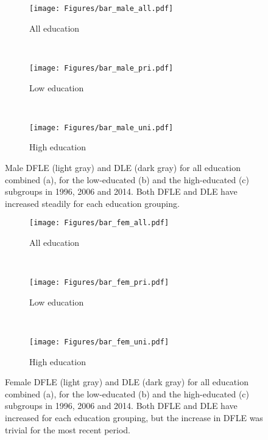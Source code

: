 \begin{figure}[ht!]
    \centering
    \begin{subfigure}[b]{0.2\textwidth}
        \texttt{[image: Figures/bar\_male\_all.pdf]}
        \caption{All education}
        \label{fig:barsmalesa}
    \end{subfigure}
    ~ %
    \begin{subfigure}[b]{0.2\textwidth}
        \texttt{[image: Figures/bar\_male\_pri.pdf]}
        \caption{Low education}
    \end{subfigure}
    ~ %
    \begin{subfigure}[b]{0.2\textwidth}
        \texttt{[image: Figures/bar\_male\_uni.pdf]}
        \caption{High education}
    \end{subfigure}
    \caption{Male DFLE (light gray) and DLE (dark gray) for all education combined (a), for the low-educated (b) and the high-educated (c) subgroups in 1996, 2006 and 2014. Both DFLE and DLE have increased steadily for each education grouping.}\label{fig:barsmales}
\end{figure}

\begin{figure}[ht!]
    \centering
    \begin{subfigure}[b]{0.2\textwidth}
        \texttt{[image: Figures/bar\_fem\_all.pdf]}
        \caption{All education}
        \label{fig:barsfemalesa}
    \end{subfigure}
    ~ %
    \begin{subfigure}[b]{0.2\textwidth}
        \texttt{[image: Figures/bar\_fem\_pri.pdf]}
        \caption{Low education}
    \end{subfigure}
    ~ %
    \begin{subfigure}[b]{0.2\textwidth}
        \texttt{[image: Figures/bar\_fem\_uni.pdf]}
        \caption{High education}
        \label{fig:barsfemalesc}
    \end{subfigure}
    \caption{Female DFLE (light gray) and DLE (dark gray) for all education combined (a), for the low-educated (b) and the high-educated (c) subgroups in 1996, 2006 and 2014. Both DFLE and DLE have increased for each education grouping, but the increase in DFLE was trivial for the most recent period.}\label{fig:barsfemales}
\end{figure}

